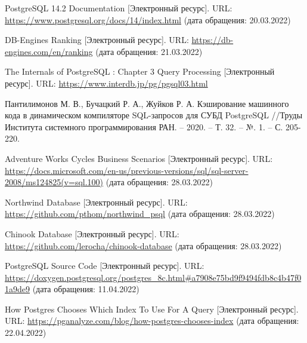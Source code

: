 \renewcommand\bibname{Список литературы}
\begin{thebibliography}{3}
	\makeatletter
	\def\@biblabel#1{#1. }
	
	PostgreSQL 14.2 Documentation [Электронный ресурс]. URL: \newline \url{https://www.postgresql.org/docs/14/index.html} (дата обращения: 20.03.2022)
	
	DB-Engines Ranking [Электронный ресурс]. URL:\newline
	\url{https://db-engines.com/en/ranking}
	(дата обращения: 21.03.2022)
	
	The Internals of PostgreSQL : Chapter 3 Query Processing [Электронный ресурс]. URL: \url{https://www.interdb.jp/pg/pgsql03.html}
	
	Пантилимонов М. В., Бучацкий Р. А., Жуйков Р. А. Кэширование машинного кода в динамическом компиляторе SQL-запросов для СУБД PostgreSQL //Труды Института системного программирования РАН. – 2020. – Т. 32. – №. 1. – С. 205-220.
	
	Adventure Works Cycles Business Scenarios [Электронный ресурс]. URL: \url{https://docs.microsoft.com/en-us/previous-versions/sql/sql-server-2008/ms124825(v=sql.100)} (дата обращения: 28.03.2022)
	
	Northwind Database [Электронный ресурс]. URL: \url{https://github.com/pthom/northwind_psql} (дата обращения: 28.03.2022)
	
	Chinook Database [Электронный ресурс]. URL: \url{https://github.com/lerocha/chinook-database} (дата обращения: 28.03.2022)
	
	PostgreSQL Source Code [Электронный ресурс]. URL: \url{https://doxygen.postgresql.org/postgres_8c.html#a7908e75bd9f9494fdb8c4b47f01a9de9} (дата обращения: 11.04.2022)
	
	How Postgres Chooses Which Index To Use For A Query [Электронный ресурс]. URL: \url{https://pganalyze.com/blog/how-postgres-chooses-index} (дата обращения: 22.04.2022)
	
\end{thebibliography}
